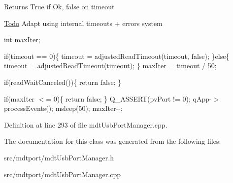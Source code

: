 \begin{DoxyReturn}{Returns}
True if Ok, false on timeout
\end{DoxyReturn}
\begin{Desc}
\item[\hyperlink{todo__todo000040}{Todo}]Adapt using internal timeouts + errors system \end{Desc}


int maxIter;

if(timeout == 0)\{ timeout = adjustedReadTimeout(timeout, false); \}else\{ timeout = adjustedReadTimeout(timeout); \} maxIter = timeout / 50;

if(readWaitCanceled())\{ return false; \}

if(maxIter $<$= 0)\{ return false; \} Q\_\-ASSERT(pvPort != 0); qApp-\/$>$processEvents(); msleep(50); maxIter-\/-\/;



Definition at line 293 of file mdtUsbPortManager.cpp.



The documentation for this class was generated from the following files:\begin{DoxyCompactItemize}
\item 
src/mdtport/mdtUsbPortManager.h\item 
src/mdtport/mdtUsbPortManager.cpp\end{DoxyCompactItemize}
